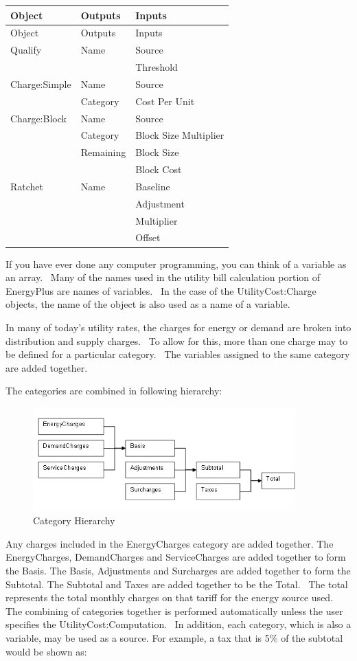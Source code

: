 \begin{longtable}[c]{@{}lll@{}}
\toprule 
Object & Outputs & Inputs \tabularnewline
\midrule
\endfirsthead

\toprule 
Object & Outputs & Inputs \tabularnewline
\midrule
\endhead

Qualify & Name & Source \tabularnewline
~ & ~ & Threshold \tabularnewline
Charge:Simple & Name & Source \tabularnewline
~ & Category & Cost Per Unit \tabularnewline
Charge:Block & Name & Source \tabularnewline
~ & Category & Block Size Multiplier \tabularnewline
~ & Remaining & Block Size \tabularnewline
~ & ~ & Block Cost \tabularnewline
Ratchet & Name & Baseline \tabularnewline
~ & ~ & Adjustment \tabularnewline
~ & ~ & Multiplier \tabularnewline
~ & ~ & Offset \tabularnewline
\bottomrule
\end{longtable}

If you have ever done any computer programming, you can think of a variable as an array.~ Many of the names used in the utility bill calculation portion of EnergyPlus are names of variables.~ In the case of the UtilityCost:Charge objects, the name of the object is also used as a name of a variable.

In many of today's utility rates, the charges for energy or demand are broken into distribution and supply charges.~ To allow for this, more than one charge may to be defined for a particular category.~ The variables assigned to the same category are added together.

The categories are combined in following hierarchy:


\begin{figure}[hbtp]
\centering
\includegraphics[width=0.9\textwidth, height=0.9\textheight, keepaspectratio=true]{media/image7909.png}
\caption{Category Hierarchy \label{fig:category-hierarchy}}
\end{figure}

Any charges included in the EnergyCharges category are added together. The EnergyCharges, DemandCharges and ServiceCharges are added together to form the Basis. The Basis, Adjustments and Surcharges are added together to form the Subtotal. The Subtotal and Taxes are added together to be the Total.~ The total represents the total monthly charges on that tariff for the energy source used.~ The combining of categories together is performed automatically unless the user specifies the UtilityCost:Computation.~ In addition, each category, which is also a variable, may be used as a source. For example, a tax that is 5\% of the subtotal would be shown as:

